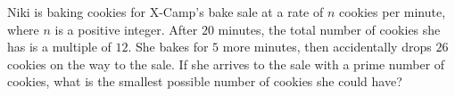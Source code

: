 Niki is baking cookies for X-Camp's bake sale at a rate of $n$ cookies per minute, where $n$ is a positive integer. After $20$ minutes, the total number of cookies she has is a multiple of $12$. She bakes for $5$ more minutes, then accidentally drops $26$ cookies on the way to the sale. If she arrives to the sale with a prime number of cookies, what is the smallest possible number of cookies she could have?
